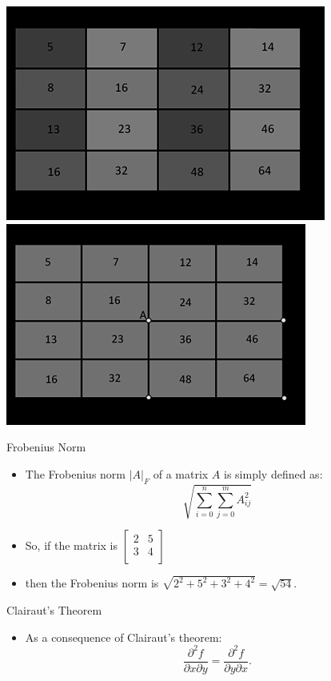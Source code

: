\documentclass[xcolor=dvipsnames]{beamer}
\begin{document}
\begin{frame}
 \begin{center}
 \includegraphics[width=.45\textwidth]{imgs/ii-dup.png}
 \includegraphics[width=.45\textwidth]{imgs/ii-final.png}
 \end{center}
\end{frame}

\begin{frame}[label=math-frobenius]{Frobenius Norm}
\begin{itemize} 
\item The Frobenius norm $|A|_F$ of a matrix $A$ is simply defined as:
\begin{equation}
 \sqrt{\sum_{i=0}^n \sum_{j=0}^m A_{ij}^2}
\end{equation}
\item So, if the matrix is 
 $
 \begin{bmatrix}
  2 & 5 \\
  3 & 4 \\
 \end{bmatrix}
 $
\item then the Frobenius norm is 
 $\sqrt{2^2 + 5^2 + 3^2 + 4^2} = \sqrt{54}$.
\end{itemize} 
\end{frame}

\begin{frame}[label=math-clairaut]{Clairaut's Theorem}
 \begin{itemize} 
  \item As a consequence of Clairaut's theorem:
 \begin{equation}
  \frac{\partial^2 f}{\partial x \partial y} = 
  \frac{\partial^2 f}{\partial y \partial x}.
 \end{equation}
 \end{itemize}  
\end{frame}
\end{document}
